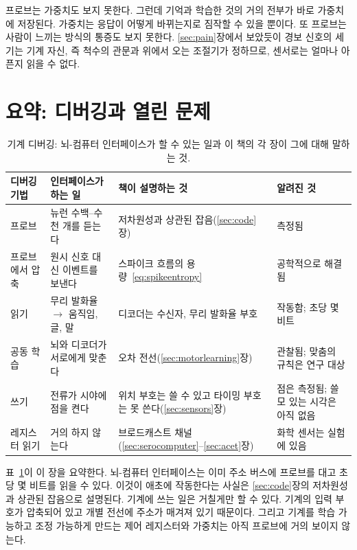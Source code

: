 프로브는 가중치도 보지 못한다. 그런데 기억과 학습한 것의 거의 전부가 바로 가중치에 저장된다. 가중치는 응답이 어떻게 바뀌는지로 짐작할 수 있을 뿐이다. 또 프로브는 사람이 느끼는 방식의 통증도 보지 못한다. \ref{sec:pain}장에서 보았듯이 경보 신호의 세기는 기계 자신, 즉 척수의 관문과 위에서 오는 조절기가 정하므로, 센서로는 얼마나 아픈지 읽을 수 없다.

\section{요약: 디버깅과 열린 문제}

\begin{table}[t]
\centering
\footnotesize
\setlength{\tabcolsep}{4pt}
\renewcommand{\arraystretch}{1.15}
\begin{tabular}{>{\raggedright}p{2.2cm}>{\raggedright}p{3.6cm}>{\raggedright}p{3.4cm}>{\raggedright\arraybackslash}p{4.0cm}}
\toprule
디버깅 기법 & 인터페이스가 하는 일 & 책이 설명하는 것 & 알려진 것 \\
\midrule
프로브 & 뉴런 수백--수천 개를 듣는다 & 저차원성과 상관된 잡음(\ref{sec:code}장) & 측정됨 \\
프로브에서 압축 & 원시 신호 대신 이벤트를 보낸다 & 스파이크 흐름의 용량~\eqref{eq:spikeentropy} & 공학적으로 해결됨 \\
읽기 & 무리 발화율 $\to$ 움직임, 글, 말 & 디코더는 수신자, 무리 발화율 부호 & 작동함; 초당 몇 비트 \\
공동 학습 & 뇌와 디코더가 서로에게 맞춘다 & 오차 전선(\ref{sec:motorlearning}장) & 관찰됨; 맞춤의 규칙은 연구 대상 \\
쓰기 & 전류가 시야에 점을 켠다 & 위치 부호는 쓸 수 있고 타이밍 부호는 못 쓴다(\ref{sec:sensors}장) & 점은 측정됨; 쓸모 있는 시각은 아직 없음 \\
레지스터 읽기 & 거의 하지 않는다 & 브로드캐스트 채널(\ref{sec:serocomputer}--\ref{sec:acet}장) & 화학 센서는 실험에 있음 \\
\bottomrule
\end{tabular}
\caption{기계 디버깅: 뇌-컴퓨터 인터페이스가 할 수 있는 일과 이 책의 각 장이 그에 대해 말하는 것.}
\label{tab:debugging}
\end{table}

표~\ref{tab:debugging}이 이 장을 요약한다. 뇌-컴퓨터 인터페이스는 이미 주소 버스에 프로브를 대고 초당 몇 비트를 읽을 수 있다. 이것이 애초에 작동한다는 사실은 \ref{sec:code}장의 저차원성과 상관된 잡음으로 설명된다. 기계에 쓰는 일은 거칠게만 할 수 있다. 기계의 입력 부호가 압축되어 있고 개별 전선에 주소가 매겨져 있기 때문이다. 그리고 기계를 학습 가능하고 조정 가능하게 만드는 제어 레지스터와 가중치는 아직 프로브에 거의 보이지 않는다.

